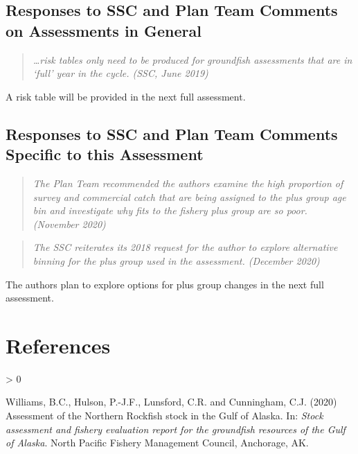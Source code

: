 \documentclass[
  11pt,
]{article}
\newlength{\cslhangindent}
\newenvironment{CSLReferences}[2] %
 {%
  \setlength{\parindent}{0pt}
  \ifodd #1 \everypar{\setlength{\hangindent}{\cslhangindent}}\ignorespaces\fi
  \ifnum #2 > 0
  \setlength{\parskip}{#2\baselineskip}
  \fi
 }%
 {}
\begin{document}
\allsectionsfont{\raggedright}

\hypertarget{responses-to-ssc-and-plan-team-comments-on-assessments-in-general}{%
\subsection{Responses to SSC and Plan Team Comments on Assessments in General}\label{responses-to-ssc-and-plan-team-comments-on-assessments-in-general}}

\begin{quote}
\emph{…risk tables only need to be produced for groundfish assessments that are in ‘full’ year in the cycle. (SSC, June 2019)}
\end{quote}

A risk table will be provided in the next full assessment.

\allsectionsfont{\raggedright}

\hypertarget{responses-to-ssc-and-plan-team-comments-specific-to-this-assessment}{%
\subsection{Responses to SSC and Plan Team Comments Specific to this Assessment}\label{responses-to-ssc-and-plan-team-comments-specific-to-this-assessment}}

\begin{quote}
\emph{The Plan Team recommended the authors examine the high proportion of survey and commercial catch that are being assigned to the plus group age bin and investigate why fits to the fishery plus group are so poor. (November 2020)}
\end{quote}

\begin{quote}
\emph{The SSC reiterates its 2018 request for the author to explore alternative binning for the plus group
used in the assessment. (December 2020)}
\end{quote}

The authors plan to explore options for plus group changes in the next full assessment.

\pagebreak
\allsectionsfont{\centering}

\hypertarget{references}{%
\section{References}\label{references}}

\hypertarget{refs}{}
\begin{CSLReferences}{1}{0}
\leavevmode\hypertarget{ref-Williams2020}{}%
Williams, B.C., Hulson, P.-J.F., Lunsford, C.R. and Cunningham, C.J. (2020) {Assessment of the Northern Rockfish stock in the Gulf of Alaska}. In: \emph{{Stock assessment and fishery evaluation report for the groundfish resources of the Gulf of Alaska}}. North Pacific Fishery Management Council, Anchorage, AK.

\end{CSLReferences}
\end{document}
